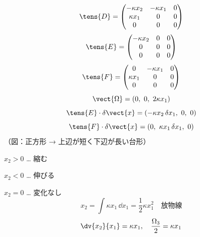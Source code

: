 \[ \tens{D}=\begin{pmatrix}-\kappa x_{2}&-\kappa x_{1}&0\\\kappa x_{1}&0&0\\0&0&0\end{pmatrix} \]
\[ \tens{E}=\begin{pmatrix}-\kappa x_{2}&0&0\\0&0&0\\0&0&0\end{pmatrix} \]
\[ \tens{F}=\begin{pmatrix}0&-\kappa x_{1}&0\\\kappa x_{1}&0&0\\0&0&0\end{pmatrix} \]
\[ \vect{\Omega}=(0,\ 0,\ 2\kappa x_{1}) \]
\[ \tens{E}\cdot\delta\vect{x}=(-\kappa x_{2}\,\delta x_{1},\ 0,\ 0) \]
\[ \tens{F}\cdot\delta\vect{x}=(0,\ \kappa x_{1}\,\delta x_{1},\ 0) \]
（図：正方形 → 上辺が短く下辺が長い台形）

$x_{2}>0$ … 縮む

$x_{2}<0$ … 伸びる

$x_{2}=0$ … 変化なし
\[ x_{2}=\int\kappa x_{1}\,\dd x_{1}=\frac{1}{2}\kappa x_{1}^{2}\quad\text{放物線} \]
\[ \dv{x_{2}}{x_{1}}=\kappa x_{1},\quad \frac{\Omega_{3}}{2}=\kappa x_{1} \]
